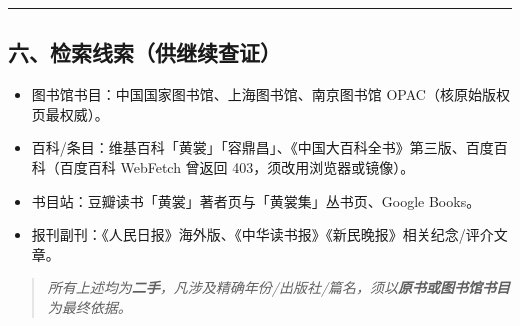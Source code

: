 \documentclass[UTF8,fontset=none,zihao=-4,a4paper]{ctexart}
\begin{document}
\medskip\hrule\medskip

\subsection{六、检索线索（供继续查证）}


\begin{itemize}
\item 图书馆书目：中国国家图书馆、上海图书馆、南京图书馆 OPAC（核原始版权页最权威）。
\item 百科/条目：维基百科「黄裳」「容鼎昌」、《中国大百科全书》第三版、百度百科（百度百科 WebFetch 曾返回 403，须改用浏览器或镜像）。
\item 书目站：豆瓣读书「黄裳」著者页与「黄裳集」丛书页、Google Books。
\item 报刊副刊：《人民日报》海外版、《中华读书报》《新民晚报》相关纪念/评介文章。
\end{itemize}


\begin{quote}\small\itshape
所有上述均为\textbf{二手}，凡涉及精确年份/出版社/篇名，须以\textbf{原书或图书馆书目}为最终依据。
\end{quote}
\end{document}
